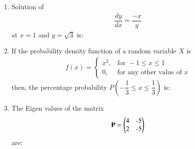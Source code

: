 \documentclass[journal]{IEEEtran}
\begin{document}
\begin{enumerate}
\item Solution of \begin{align} \dfrac{dy}{dx} = \dfrac{-x}{y} \end{align}at $x = 1$ and $y = \sqrt{3}$ is: \hfill {}
\begin{enumerate}
\end{enumerate}

\item If the probability density function of a random variable $X$ is  
\begin{align}
f(x) = 
\begin{cases}
x^2, & \text{for } -1 \leq x \leq 1 \\
0, & \text{for any other value of } x
\end{cases}
\end{align}
then, the percentage probability $P\left( -\dfrac{1}{3} \leq x \leq \dfrac{1}{3} \right)$ is: \hfill {}
\begin{enumerate}
\end{enumerate}

\item The Eigen values of the matrix \hfill {}
\begin{align}
\mathbf{P} = \myvec{$4$ & $-5$ \\ $2$ & $-5$}
\end{align}
are:
\begin{enumerate}
\end{enumerate}


\end{enumerate}
\end{document}
